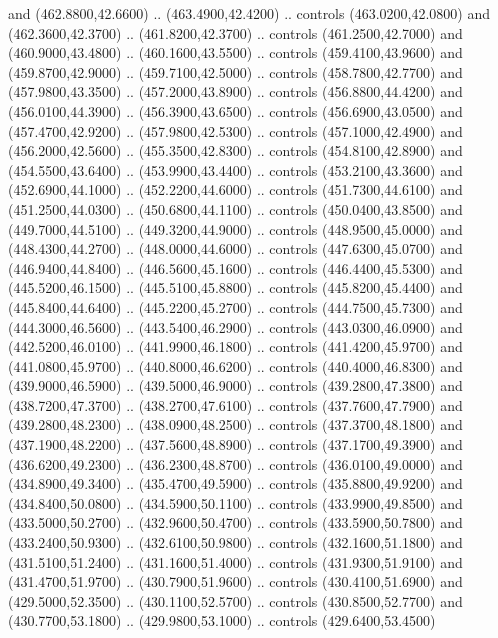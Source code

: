{\begin{scope}[y=0.80pt, x=0.80pt, yscale=-1, xscale=1, inner sep=0pt, outer sep=0pt, #1]
      and (462.8800,42.6600) .. (463.4900,42.4200) .. controls (463.0200,42.0800)
      and (462.3600,42.3700) .. (461.8200,42.3700) .. controls (461.2500,42.7000)
      and (460.9000,43.4800) .. (460.1600,43.5500) .. controls (459.4100,43.9600)
      and (459.8700,42.9000) .. (459.7100,42.5000) .. controls (458.7800,42.7700)
      and (457.9800,43.3500) .. (457.2000,43.8900) .. controls (456.8800,44.4200)
      and (456.0100,44.3900) .. (456.3900,43.6500) .. controls (456.6900,43.0500)
      and (457.4700,42.9200) .. (457.9800,42.5300) .. controls (457.1000,42.4900)
      and (456.2000,42.5600) .. (455.3500,42.8300) .. controls (454.8100,42.8900)
      and (454.5500,43.6400) .. (453.9900,43.4400) .. controls (453.2100,43.3600)
      and (452.6900,44.1000) .. (452.2200,44.6000) .. controls (451.7300,44.6100)
      and (451.2500,44.0300) .. (450.6800,44.1100) .. controls (450.0400,43.8500)
      and (449.7000,44.5100) .. (449.3200,44.9000) .. controls (448.9500,45.0000)
      and (448.4300,44.2700) .. (448.0000,44.6000) .. controls (447.6300,45.0700)
      and (446.9400,44.8400) .. (446.5600,45.1600) .. controls (446.4400,45.5300)
      and (445.5200,46.1500) .. (445.5100,45.8800) .. controls (445.8200,45.4400)
      and (445.8400,44.6400) .. (445.2200,45.2700) .. controls (444.7500,45.7300)
      and (444.3000,46.5600) .. (443.5400,46.2900) .. controls (443.0300,46.0900)
      and (442.5200,46.0100) .. (441.9900,46.1800) .. controls (441.4200,45.9700)
      and (441.0800,45.9700) .. (440.8000,46.6200) .. controls (440.4000,46.8300)
      and (439.9000,46.5900) .. (439.5000,46.9000) .. controls (439.2800,47.3800)
      and (438.7200,47.3700) .. (438.2700,47.6100) .. controls (437.7600,47.7900)
      and (439.2800,48.2300) .. (438.0900,48.2500) .. controls (437.3700,48.1800)
      and (437.1900,48.2200) .. (437.5600,48.8900) .. controls (437.1700,49.3900)
      and (436.6200,49.2300) .. (436.2300,48.8700) .. controls (436.0100,49.0000)
      and (434.8900,49.3400) .. (435.4700,49.5900) .. controls (435.8800,49.9200)
      and (434.8400,50.0800) .. (434.5900,50.1100) .. controls (433.9900,49.8500)
      and (433.5000,50.2700) .. (432.9600,50.4700) .. controls (433.5900,50.7800)
      and (433.2400,50.9300) .. (432.6100,50.9800) .. controls (432.1600,51.1800)
      and (431.5100,51.2400) .. (431.1600,51.4000) .. controls (431.9300,51.9100)
      and (431.4700,51.9700) .. (430.7900,51.9600) .. controls (430.4100,51.6900)
      and (429.5000,52.3500) .. (430.1100,52.5700) .. controls (430.8500,52.7700)
      and (430.7700,53.1800) .. (429.9800,53.1000) .. controls (429.6400,53.4500)

\end{scope}}
